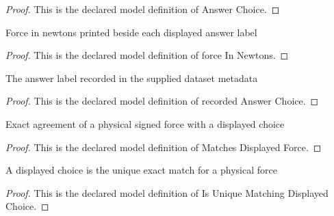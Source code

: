 \begin{proof}
  This is the declared model definition of Answer Choice.
\end{proof}
\begin{definition}
  \label{def:physics:phyx-mini-0801:phyxminiproblems-problemphyxmini0801-answerchoice-forceinnewtons}
  Force in newtons printed beside each displayed answer label
\end{definition}
\begin{proof}
  This is the declared model definition of force In Newtons.
\end{proof}
\begin{definition}
  \label{def:physics:phyx-mini-0801:phyxminiproblems-problemphyxmini0801-recordedanswerchoice}
  The answer label recorded in the supplied dataset metadata
\end{definition}
\begin{proof}
  This is the declared model definition of recorded Answer Choice.
\end{proof}
\begin{definition}
  \label{def:physics:phyx-mini-0801:phyxminiproblems-problemphyxmini0801-matchesdisplayedforce}
  Exact agreement of a physical signed force with a displayed choice
\end{definition}
\begin{proof}
  This is the declared model definition of Matches Displayed Force.
\end{proof}
\begin{definition}
  \label{def:physics:phyx-mini-0801:phyxminiproblems-problemphyxmini0801-isuniquematchingdisplayedchoice}
  A displayed choice is the unique exact match for a physical force
\end{definition}
\begin{proof}
  This is the declared model definition of Is Unique Matching Displayed Choice.
\end{proof}

